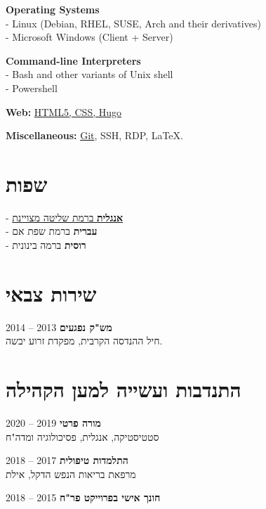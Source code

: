 \documentclass[
	12pt,a4paper %
]{article}
\begin{document}
\begin{hebrew}
\begin{paracol}{2}
		\unsetRTL
		\setLTR

\textbf{Operating Systems} \\
- Linux (Debian, RHEL, SUSE, Arch and their derivatives)\\
- Microsoft Windows (Client + Server)

\textbf{Command-line Interpreters} \\
- Bash and other variants of Unix shell \\
- Powershell

\textbf{Web:} \href{https://kiril-u.github.io/resume/}{HTML5, CSS, Hugo}


\textbf{Miscellaneous:} \href{https://github.com/kiril-u}{Git}, SSH, RDP, \LaTeX.

		\unsetLTR
		\setRTL
		\switchcolumn

		\section{שפות}
		- \href{https://loona-il.000webhostapp.com/resume-references/English-Skill.png}{\textbf{אנגלית} ברמת שליטה מצויינת} \\
		- \textbf{עברית} ברמת שפת אם \\
		- \textbf{רוסית} ברמה בינונית

		\section{שירות צבאי}
		\textbf{מש"ק נפגעים} \hfill 2013 -- 2014 \\
		חיל ההנדסה הקרבית, מפקדת זרוע יבשה.

		\section{התנדבות ועשייה למען הקהילה}
		
		\textbf{מורה פרטי} \hfill 2019 -- 2020 \\
		סטטיסטיקה, אנגלית, פסיכולוגיה ומדה"ח

		\textbf{התלמדות טיפולית} \hfill 2017 -- 2018 \\
		מרפאת בריאות הנפש הדקל, אילת

		\textbf{חונך אישי בפרוייקט פר"ח} \hfill 2015 -- 2018
	\end{paracol} %
\end{hebrew}
\unsetRTL
\end{document}
